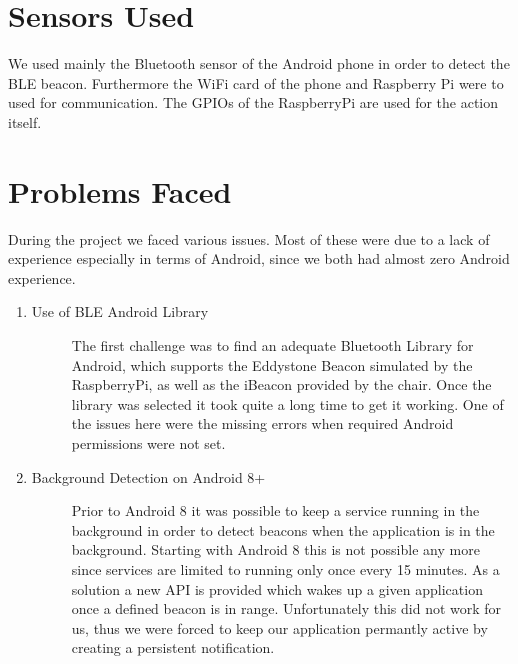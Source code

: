 \documentclass[
10pt, %
a4paper, %
oneside, %
headinclude,footinclude, %
BCOR5mm, %
]{scrartcl}
\begin{document}
\section{Sensors Used}
We used mainly the Bluetooth sensor of the Android phone in order to detect the BLE beacon. Furthermore the WiFi card of the phone and Raspberry Pi were to used for communication. The GPIOs of the RaspberryPi are used for the action itself.


\section{Problems Faced}
During the project we faced various issues. Most of these were due to a lack of experience especially in terms of Android, since we both had almost zero Android experience.

\begin{enumerate}
\item 
	\begin{description}
	\item[Use of BLE Android Library] The first challenge was to find an adequate Bluetooth Library for Android, which supports the Eddystone Beacon simulated by the RaspberryPi, as well as the iBeacon provided by the chair. Once the library was selected it took quite a long time to get it working. One of the issues here were the missing errors when required Android permissions were not set. 
	\end{description}
	\item 
	\begin{description}
	\item[Background Detection on Android 8+] Prior to Android 8 it was possible to keep a service running in the background in order to detect beacons when the application is in the background. Starting with Android 8 this is not possible any more \cite{young_2017} since services are limited to running only once every 15 minutes. As a solution a new API is provided which wakes up a given application once a defined beacon is in range. Unfortunately this did not work for us, thus we were forced to keep our application permantly active by creating a persistent notification.
	\end{description}
\end{enumerate}
\end{document}
